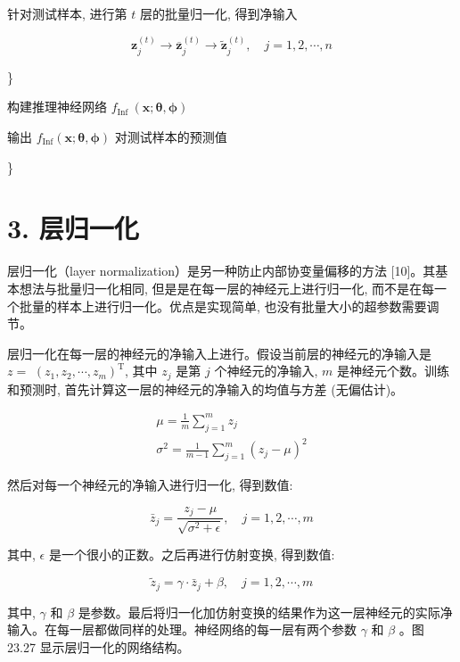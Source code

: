 \documentclass[10pt]{article}
\begin{document}
\begin{CJK*}{UTF8}{bsmi}
针对测试样本, 进行第 $t$ 层的批量归一化, 得到净输入

$$
\boldsymbol{z}_{j}^{(t)} \rightarrow \overline{\boldsymbol{z}}_{j}^{(t)} \rightarrow \tilde{\boldsymbol{z}}_{j}^{(t)}, \quad j=1,2, \cdots, n
$$

\}

构建推理神经网络 $f_{\text {Inf }}(\boldsymbol{x} ; \boldsymbol{\theta}, \boldsymbol{\phi})$

输出 $f_{\operatorname{Inf}}(\boldsymbol{x} ; \boldsymbol{\theta}, \boldsymbol{\phi})$ 对测试样本的预测值

\}

\section*{3. 层归一化}
层归一化（layer normalization）是另一种防止内部协变量偏移的方法 [10]。其基本想法与批量归一化相同, 但是是在每一层的神经元上进行归一化, 而不是在每一个批量的样本上进行归一化。优点是实现简单, 也没有批量大小的超参数需要调节。

层归一化在每一层的神经元的净输入上进行。假设当前层的神经元的净输入是 $z=$ $\left(z_{1}, z_{2}, \cdots, z_{m}\right)^{\mathrm{T}}$, 其中 $z_{j}$ 是第 $j$ 个神经元的净输入, $m$ 是神经元个数。训练和预测时, 首先计算这一层的神经元的净输入的均值与方差 (无偏估计)。


\begin{gather*}
\mu=\frac{1}{m} \sum_{j=1}^{m} z_{j}  \tag{23.65}\\
\sigma^{2}=\frac{1}{m-1} \sum_{j=1}^{m}\left(z_{j}-\mu\right)^{2} \tag{23.66}
\end{gather*}


然后对每一个神经元的净输入进行归一化, 得到数值:


\begin{equation*}
\bar{z}_{j}=\frac{z_{j}-\mu}{\sqrt{\sigma^{2}+\epsilon}}, \quad j=1,2, \cdots, m \tag{23.67}
\end{equation*}


其中, $\epsilon$ 是一个很小的正数。之后再进行仿射变换, 得到数值:


\begin{equation*}
\tilde{z}_{j}=\gamma \cdot \bar{z}_{j}+\beta, \quad j=1,2, \cdots, m \tag{23.68}
\end{equation*}


其中, $\gamma$ 和 $\beta$ 是参数。最后将归一化加仿射变换的结果作为这一层神经元的实际净输入。在每一层都做同样的处理。神经网络的每一层有两个参数 $\gamma$ 和 $\beta$ 。图 23.27 显示层归一化的网络结构。


\end{CJK*}
\end{document}
